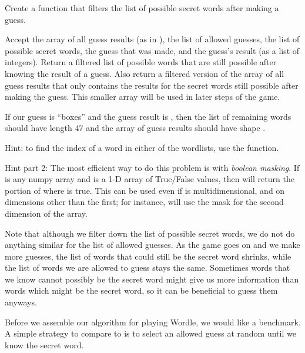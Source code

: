 \begin{problem}\label{infotheory:prob:filter}
	Create a function that filters the list of possible secret words after making a guess.
	
	Accept the array of all guess results (as in ), the list of allowed guesses, the list of possible secret words, the guess that was made, and the guess's result (as a list of integers).
	Return a filtered list of possible words that are still possible after knowing the result of a guess.
	Also return a filtered version of the array of all guess results that only contains the results for the secret words still possible after making the guess.
	This smaller array will be used in later steps of the game.
	
	If our guess is ``boxes'' and the guess result is \li{[0,0,0,2,1]}, then the list of remaining words should have length 47 and the array of guess results should have shape .
	
	Hint: to find the index of a word in either of the wordlists, use the  function.
	
	Hint part 2: The most efficient way to do this problem is with \emph{boolean masking}.
	If  is any numpy array and  is a 1-D array of True/False values, then  will return the portion of  where  is true.
	This can be used even if  is multidimensional, and on dimensions other than the first; for instance,  will use the mask for the second dimension of the array.
	
\end{problem}
\begin{info}
Note that although we filter down the list of possible secret words, we do not do anything similar for the list of allowed guesses.
As the game goes on and we make more guesses, the list of words that could still be the secret word shrinks, while the list of words we are allowed to guess stays the same.
Sometimes words that we know cannot possibly be the secret word might give us more information than words which might be the secret word, so it can be beneficial to guess them anyways.
\end{info}

Before we assemble our algorithm for playing Wordle, we would like a benchmark.
A simple strategy to compare to is to select an allowed guess at random until we know the secret word.

